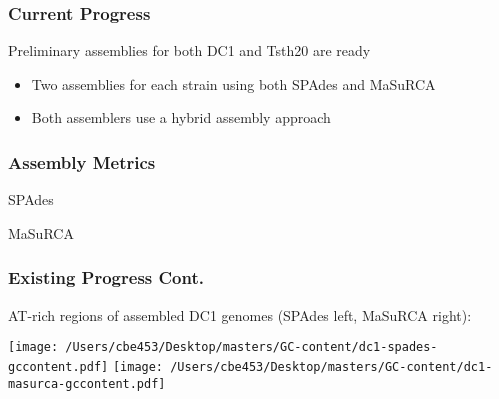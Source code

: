 \documentclass{beamer}
\begin{document}
\begin{frame}
  \frametitle{Current Progress}
  Preliminary assemblies for both DC1 and Tsth20 are ready
  \begin{itemize}
  \item Two assemblies for each strain using both SPAdes and MaSuRCA
  \item Both assemblers use a hybrid assembly approach
  \end{itemize}
\end{frame}

\begin{frame}
  \frametitle{Assembly Metrics}
  SPAdes
  \begin{center}
    \label{table1} \vspace{0.5cm}
  \end{center}
  MaSuRCA
  \begin{center}
  \label{table1} \vspace{0.5cm}
  \end{center}
\end{frame}

\begin{frame}
  \frametitle{Existing Progress Cont.}
  AT-rich regions of assembled DC1 genomes (SPAdes left, MaSuRCA right):
  \begin{center}
    \texttt{[image: /Users/cbe453/Desktop/masters/GC-content/dc1-spades-gccontent.pdf]}
    \texttt{[image: /Users/cbe453/Desktop/masters/GC-content/dc1-masurca-gccontent.pdf]}
  \end{center}
\end{frame}
\end{document}
